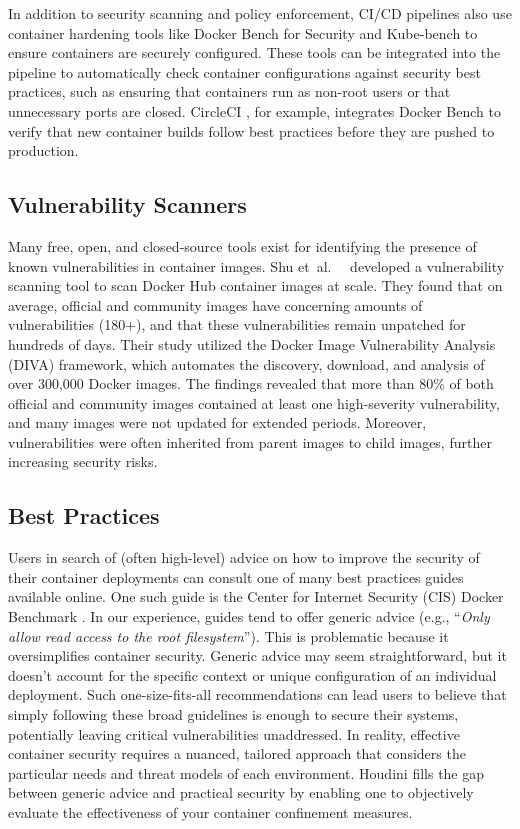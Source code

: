 \documentclass[12pt]{report}
\newcommand{\etal}{et~al.\ } %
\begin{document}
\begin{doublespace}
In addition to security scanning and policy enforcement, CI/CD pipelines also use container hardening tools like Docker Bench for Security \cite{docker_bench} and Kube-bench \cite{kube_bench} to ensure containers are securely configured. These tools can be integrated into the pipeline to automatically check container configurations against security best practices, such as ensuring that containers run as non-root users or that unnecessary ports are closed. CircleCI \cite{circleci}, for example, integrates Docker Bench to verify that new container builds follow best practices before they are pushed to production.\\

\subsection{Vulnerability Scanners} 

Many free, open, and closed-source tools exist for identifying the presence of known vulnerabilities in container images. Shu \etal~\cite{shu2017study} developed a vulnerability scanning tool to scan Docker Hub container images at scale. They found that on average, official and community images have concerning amounts of vulnerabilities (180+), and that these vulnerabilities remain unpatched for hundreds of days. Their study utilized the Docker Image Vulnerability Analysis (DIVA) framework, which automates the discovery, download, and analysis of over 300,000 Docker images. The findings revealed that more than 80\% of both official and community images contained at least one high-severity vulnerability, and many images were not updated for extended periods. Moreover, vulnerabilities were often inherited from parent images to child images, further increasing security risks.\\

\subsection{Best Practices} 

Users in search of (often high-level) advice on how to improve the security of their container deployments can consult one of many best practices guides available online. One such guide is the Center for Internet Security (CIS) Docker Benchmark \cite{CIS}. In our experience, guides tend to offer generic advice (e.g., ``\textit{Only allow read access to the root filesystem}''). This is problematic because it oversimplifies container security. Generic advice may seem straightforward, but it doesn't account for the specific context or unique configuration of an individual deployment. Such one-size-fits-all recommendations can lead users to believe that simply following these broad guidelines is enough to secure their systems, potentially leaving critical vulnerabilities unaddressed. In reality, effective container security requires a nuanced, tailored approach that considers the particular needs and threat models of each environment. Houdini fills the gap between generic advice and practical security by enabling one to objectively evaluate the effectiveness of your container confinement measures.\\


\end{doublespace}
\end{document}
